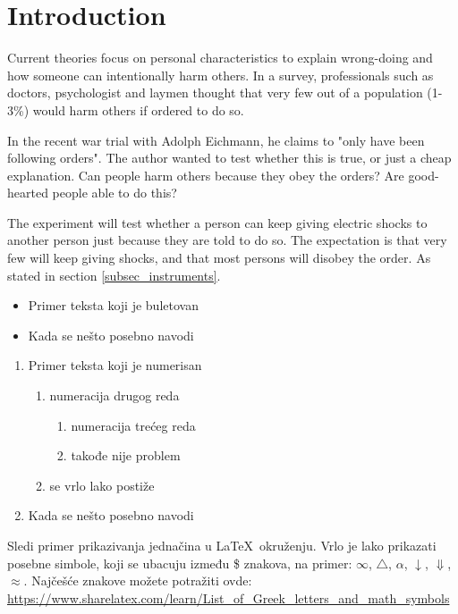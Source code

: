 \documentclass[conference]{IEEEtran}
\begin{document}

\section{Introduction}
\label{sec_introduction}

Current theories focus on personal characteristics to explain wrong-doing and how someone can 
intentionally harm others. In a survey, professionals such as doctors, psychologist and laymen 
thought that very few out of a population (1-3\%) would harm others if ordered to do so.

In the recent war trial with Adolph Eichmann, he claims to "only have been following orders". 
The author wanted to test whether this is true, or just a cheap explanation. Can people harm 
others because they obey the orders? Are good-hearted people able to do this?

The experiment will test whether a person can keep giving electric shocks to another person 
just because they are told to do so. The expectation is that very few will keep giving shocks, 
and that most persons will disobey the order. As stated in section \ref{subsec_instruments}.

\begin{itemize}
\item Primer teksta koji je buletovan
\item Kada se nešto posebno navodi
\end{itemize}

\begin{enumerate}
\item Primer teksta koji je numerisan
\begin{enumerate}
\item numeracija drugog reda
\begin{enumerate}
\item numeracija trećeg reda
\item takođe nije problem
\end{enumerate}
\item se vrlo lako postiže
\end{enumerate}
\item Kada se nešto posebno navodi
\end{enumerate}

Sledi primer prikazivanja jednačina u \LaTeX\ okruženju. Vrlo je lako prikazati posebne simbole, koji se ubacuju između \$ znakova, na primer: $\infty$, $\triangle$, $\alpha$, $\downarrow$, $\Downarrow$, $\approx$. Najčešće znakove možete potražiti ovde: \url{https://www.sharelatex.com/learn/List_of_Greek_letters_and_math_symbols}
\end{document}
